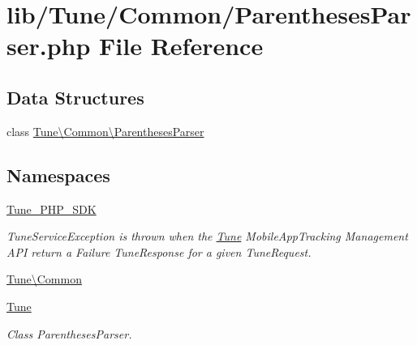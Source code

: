 \hypertarget{ParenthesesParser_8php}{\section{lib/\-Tune/\-Common/\-Parentheses\-Parser.php File Reference}
\label{ParenthesesParser_8php}
}
\subsection*{Data Structures}
\begin{DoxyCompactItemize}
\item 
class \hyperlink{classTune_1_1Common_1_1ParenthesesParser}{Tune\textbackslash{}\-Common\textbackslash{}\-Parentheses\-Parser}
\end{DoxyCompactItemize}
\subsection*{Namespaces}
\begin{DoxyCompactItemize}
\item 
\hyperlink{namespaceTune__PHP__SDK}{Tune\-\_\-\-P\-H\-P\-\_\-\-S\-D\-K}
\begin{DoxyCompactList}\small\item\em Tune\-Service\-Exception is thrown when the \hyperlink{namespaceTune}{Tune} Mobile\-App\-Tracking Management A\-P\-I return a Failure Tune\-Response for a given Tune\-Request. \end{DoxyCompactList}\item 
\hyperlink{namespaceTune_1_1Common}{Tune\textbackslash{}\-Common}
\item 
\hyperlink{namespaceTune}{Tune}
\begin{DoxyCompactList}\small\item\em Class Parentheses\-Parser. \end{DoxyCompactList}\end{DoxyCompactItemize}
